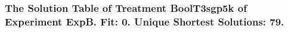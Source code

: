 \begin{frame}
 \fontsize{8pt}{9pt}\selectfont
 \frametitle{ The Solution Table of Treatment BoolT3sgp5k of Experiment ExpB. Fit: 0. Unique Shortest Solutions: 79. }

 \label{ExpBSolutionTable018.tex}  
 \end{frame}

